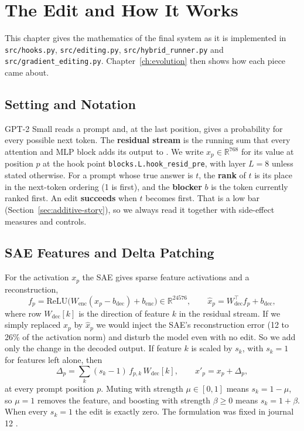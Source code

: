 \chapter{The Edit and How It Works}\label{ch:method}

This chapter gives the mathematics of the final system as it is implemented in \texttt{src/hooks.py}, \texttt{src/editing.py}, \texttt{src/hybrid\_runner.py} and \texttt{src/gradient\_editing.py}. Chapter~\ref{ch:evolution} then shows how each piece came about.

\section{Setting and Notation}

GPT-2 Small reads a prompt and, at the last position, gives a probability for every possible next token. The \textbf{residual stream} is the running sum that every attention and MLP block adds its output to \cite{r53}. We write $x_p\in\mathbb{R}^{768}$ \cite{r1} for its value at position $p$ at the hook point \texttt{blocks.L.hook\_resid\_pre}, with layer $L=8$ unless stated otherwise. For a prompt whose true answer is $t$, the \textbf{rank} of $t$ is its place in the next-token ordering (1 is first), and the \textbf{blocker} $b$ is the token currently ranked first. An edit \textbf{succeeds} when $t$ becomes first. That is a low bar (Section~\ref{sec:additive-story}), so we always read it together with side-effect measures and controls.

\section{SAE Features and Delta Patching}

For the activation $x_p$ the SAE gives sparse feature activations and a reconstruction,
\begin{equation}\label{eq:sae}
f_p=\mathrm{ReLU}\bigl(W_{\mathrm{enc}}(x_p-b_{\mathrm{dec}})+b_{\mathrm{enc}}\bigr)\in\mathbb{R}^{24576},\qquad \hat{x}_p=W_{\mathrm{dec}}^{\top}f_p+b_{\mathrm{dec}},
\end{equation}
where row $W_{\mathrm{dec}}[k]$ is the direction of feature $k$ in the residual stream. If we simply replaced $x_p$ by $\hat{x}_p$ we would inject the SAE's reconstruction error (12 to 26\% of the activation norm) and disturb the model even with no edit. So we add only the change in the decoded output. If feature $k$ is scaled by $s_k$, with $s_k=1$ for features left alone, then
\begin{equation}\label{eq:delta}
\Delta_p=\sum_{k}(s_k-1)\,f_{p,k}\,W_{\mathrm{dec}}[k],\qquad x'_p=x_p+\Delta_p ,
\end{equation}
at every prompt position $p$. Muting with strength $\mu\in[0,1]$ means $s_k=1-\mu$, so $\mu=1$ removes the feature, and boosting with strength $\beta\ge0$ means $s_k=1+\beta$. When every $s_k=1$ the edit is exactly zero. The formulation was fixed in journal 12 \cite{p5}.

